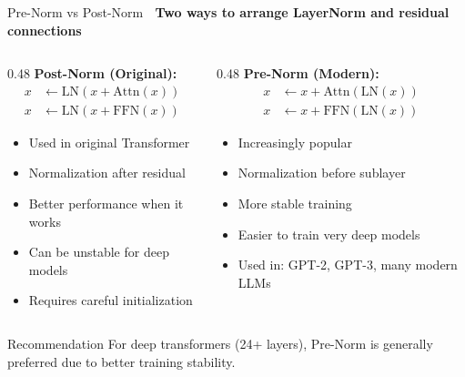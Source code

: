 \documentclass[aspectratio=169]{beamer}
\begin{document}
\begin{frame}[shrink=10]{Pre-Norm vs Post-Norm 🔄}
\small
\textbf{Two ways to arrange LayerNorm and residual connections}

\vspace{1em}

\begin{columns}[T]
\begin{column}{0.48\textwidth}
\textbf{Post-Norm (Original):}
\begin{align*}
x &\leftarrow \text{LN}(x + \text{Attn}(x)) \\
x &\leftarrow \text{LN}(x + \text{FFN}(x))
\end{align*}

\begin{itemize}\setlength{\itemsep}{0pt}
    \item Used in original Transformer
    \item Normalization after residual
    \item Better performance when it works
    \item \alert{Can be unstable for deep models}
    \item Requires careful initialization
\end{itemize}
\end{column}

\begin{column}{0.48\textwidth}
\textbf{Pre-Norm (Modern):}
\begin{align*}
x &\leftarrow x + \text{Attn}(\text{LN}(x)) \\
x &\leftarrow x + \text{FFN}(\text{LN}(x))
\end{align*}

\begin{itemize}\setlength{\itemsep}{0pt}
    \item Increasingly popular
    \item Normalization before sublayer
    \item \alert{More stable training}
    \item Easier to train very deep models
    \item Used in: GPT-2, GPT-3, many modern LLMs
\end{itemize}
\end{column}
\end{columns}

\vspace{1em}

\begin{block}{Recommendation}
For deep transformers (24+ layers), Pre-Norm is generally preferred due to better training stability.
\end{block}
\end{frame}
\end{document}
